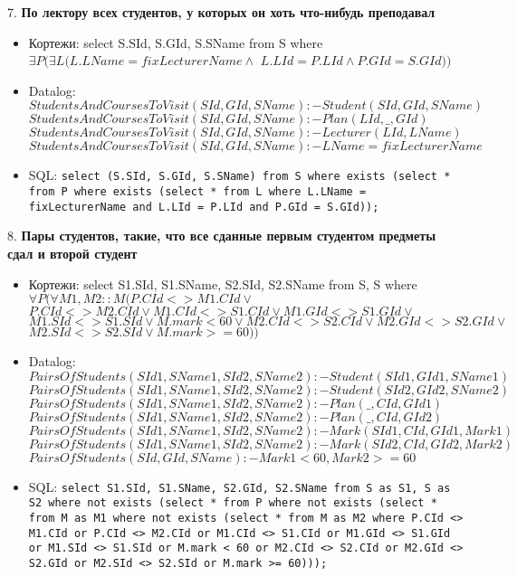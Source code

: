 \documentclass[11pt,a4paper,oneside]{article}
\begin{document}
7. \textbf{По лектору всех студентов, у которых он хоть что-нибудь преподавал}
\begin{itemize}
\item Кортежи: select S.SId, S.GId, S.SName from S where $\exists P (\exists L (L.LName = fixLecturerName \land$ $L.LId = P.LId \land P.GId = S.GId))$
\item Datalog: 
$StudentsAndCoursesToVisit(SId, GId, SName) :- Student(SId, GId, SName)$
\newline
$StudentsAndCoursesToVisit(SId, GId, SName) :- Plan(LId, \_, GId)$
\newline
$StudentsAndCoursesToVisit(SId, GId, SName) :- Lecturer(LId, LName)$
\newline
$StudentsAndCoursesToVisit(SId, GId, SName) :- LName = fixLecturerName$

\item SQL: \texttt{select (S.SId, S.GId, S.SName) from S where exists (select * from P where exists (select * from L where L.LName = fixLecturerName and L.LId = P.LId and P.GId = S.GId));}
\end{itemize}

8. \textbf{Пары студентов, такие, что все сданные первым студентом предметы сдал и второй студент}
\begin{itemize}
\item Кортежи: select S1.SId, S1.SName, S2.SId, S2.SName from S, S where $\forall P (\forall M1, M2 :: M (P.CId <> M1.CId \lor$ $P.CId <> M2.CId \lor M1.CId <> S1.CId \lor M1.GId <> S1.GId \lor$ $M1.SId <> S1.SId \lor M.mark < 60 \lor M2.CId <> S2.CId \lor M2.GId <> S2.GId \lor$ $M2.SId <> S2.SId \lor M.mark >= 60))$
\item Datalog: 
$PairsOfStudents(SId1, SName1, SId2, SName2) :- Student(SId1, GId1, SName1)$
\newline
$PairsOfStudents(SId1, SName1, SId2, SName2) :- Student(SId2, GId2, SName2)$
\newline
$PairsOfStudents(SId1, SName1, SId2, SName2) :- Plan(\_, CId, GId1)$
\newline
$PairsOfStudents(SId1, SName1, SId2, SName2) :- Plan(\_, CId, GId2)$
\newline
$PairsOfStudents(SId1, SName1, SId2, SName2) :- Mark(SId1, CId, GId1, Mark1)$
\newline
$PairsOfStudents(SId1, SName1, SId2, SName2) :- Mark(SId2, CId, GId2, Mark2)$
\newline
$PairsOfStudents(SId, GId, SName) :- Mark1 < 60, Mark2 >= 60$

\item SQL: \texttt{select S1.SId, S1.SName, S2.GId, S2.SName from S as S1, S as S2 where not exists (select * from P where not exists (select * from M as M1 where not exists (select * from M as M2 where P.CId <> M1.CId or P.CId <> M2.CId or M1.CId <> S1.CId or M1.GId <> S1.GId or M1.SId <> S1.SId or M.mark < 60 or M2.CId <> S2.CId or M2.GId <> S2.GId or M2.SId <> S2.SId or M.mark >= 60)));}
\end{itemize}
\end{document}

